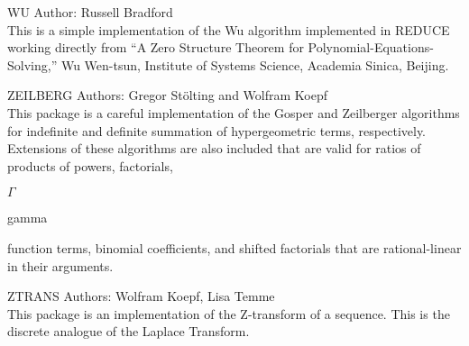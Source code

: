 \begin{Package}{WU}
Author: Russell Bradford\\

This is a simple implementation of the Wu algorithm implemented in REDUCE
working directly from ``A Zero Structure Theorem for
Polynomial-Equations-Solving,'' Wu Wen-tsun, Institute of Systems Science,
Academia Sinica, Beijing.
\end{Package}

\begin{Package}{ZEILBERG}
Authors: Gregor St{\"o}lting and Wolfram Koepf\\

This package is a careful implementation of the Gosper and Zeilberger
algorithms for indefinite and definite summation of hypergeometric terms,
respectively.  Extensions of these algorithms are also included that are
valid for ratios of products of powers,
factorials,\begin{TEX}$\Gamma$ \end{TEX} \begin{INFO}gamma \end{INFO}function
terms, binomial coefficients, and shifted factorials that are
rational-linear in their arguments.
\end{Package}

\begin{Package}{ZTRANS}
Authors: Wolfram Koepf, Lisa Temme\\

This package is an implementation of the Z-transform of a sequence.
This is the discrete analogue of the Laplace Transform.
\end{Package}

